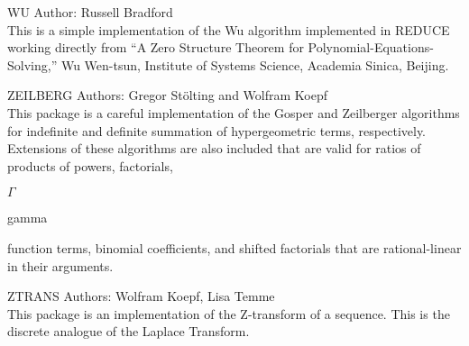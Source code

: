 \begin{Package}{WU}
Author: Russell Bradford\\

This is a simple implementation of the Wu algorithm implemented in REDUCE
working directly from ``A Zero Structure Theorem for
Polynomial-Equations-Solving,'' Wu Wen-tsun, Institute of Systems Science,
Academia Sinica, Beijing.
\end{Package}

\begin{Package}{ZEILBERG}
Authors: Gregor St{\"o}lting and Wolfram Koepf\\

This package is a careful implementation of the Gosper and Zeilberger
algorithms for indefinite and definite summation of hypergeometric terms,
respectively.  Extensions of these algorithms are also included that are
valid for ratios of products of powers,
factorials,\begin{TEX}$\Gamma$ \end{TEX} \begin{INFO}gamma \end{INFO}function
terms, binomial coefficients, and shifted factorials that are
rational-linear in their arguments.
\end{Package}

\begin{Package}{ZTRANS}
Authors: Wolfram Koepf, Lisa Temme\\

This package is an implementation of the Z-transform of a sequence.
This is the discrete analogue of the Laplace Transform.
\end{Package}

